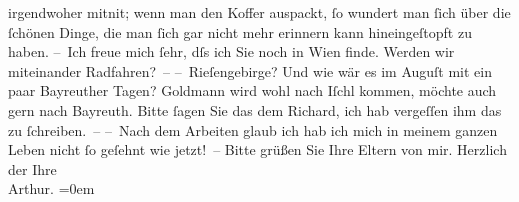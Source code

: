 \begin{ledgroupsized}[t]{13cm}
               irgendwoher mitni{\geminationm}t; wenn man den Koffer auspackt, ſo
               wundert man ſich über die ſchönen Dinge, die man ſich gar nicht mehr erinnern {\pb}kann hineingeſtopft zu haben.\pend
           \pstart
           – Ich freue mich ſehr, dſs ich Sie noch in Wien
               finde. Werden wir miteinander Radfahren? – – Rieſengebirge? Und wie wär es im Auguſt mit ein paar Bayreuther Tagen? Goldmann wird wohl nach Iſchl kommen, möchte auch gern nach Bay{\pb}reuth. Bitte ſagen Sie das dem Richard, ich hab vergeſſen ihm das zu ſchreiben. –\pend
           \pstart
           – Nach dem Arbeiten glaub ich hab ich mich in meinem ganzen Leben nicht ſo geſehnt
               wie jetzt! –\pend
           \pstart
           Bitte grüßen Sie Ihre Eltern von mir.\pend
           \pstart
           Herzlich der Ihre{\\[\baselineskip]}\spacefill\mbox{Arthur.}\pend
           \leftskip=0em{}
         
         \endnumbering{}\end{ledgroupsized}  \newcommand{\dateiname}{L00679}\newcommand{\titel}{Arthur Schnitzler an Hugo von Hofmannsthal, 20. 5. 1897}\newcommand{\editorInnen}{Martin Anton Müller und Gerd-Hermann Susen}
      